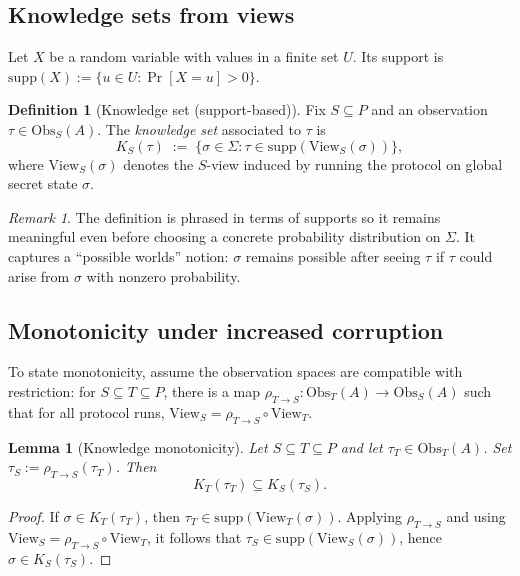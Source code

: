 \documentclass[11pt,a4paper]{article}
\newtheorem{lemma}[theorem]{Lemma}
\theoremstyle{definition}
\newtheorem{definition}[theorem]{Definition}
\theoremstyle{remark}
\newtheorem{remark}[theorem]{Remark}
\newcommand{\Parties}{P}
\newcommand{\View}{\mathrm{View}}
\newcommand{\Obs}{\mathrm{Obs}}
\newcommand{\supp}{\mathrm{supp}}
\begin{document}
\subsection{Knowledge sets from views}
Let \(X\) be a random variable with values in a finite set \(U\). Its support is \(\supp(X) := \{u\in U : \Pr[X=u] > 0\}\).

\begin{definition}[Knowledge set (support-based)]
\label{def:knowledge-set}
Fix \(S\subseteq \Parties\) and an observation \(\tau \in \Obs_S(A)\). The \emph{knowledge set} associated to \(\tau\) is
\begin{equation}
\label{eq:knowledge-set}
  K_S(\tau) \;:=\; \{\sigma \in \Sigma : \tau \in \supp(\View_S(\sigma))\},
\end{equation}
where \(\View_S(\sigma)\) denotes the \(S\)-view induced by running the protocol on global secret state \(\sigma\).
\end{definition}

\begin{remark}
The definition is phrased in terms of supports so it remains meaningful even before choosing a concrete probability distribution on \(\Sigma\). It captures a ``possible worlds'' notion: \(\sigma\) remains possible after seeing \(\tau\) if \(\tau\) could arise from \(\sigma\) with nonzero probability.
\end{remark}

\subsection{Monotonicity under increased corruption}
To state monotonicity, assume the observation spaces are compatible with restriction: for \(S\subseteq T\subseteq \Parties\), there is a map \(\rho_{T\to S} : \Obs_T(A)\to \Obs_S(A)\) such that for all protocol runs,
\(\View_S = \rho_{T\to S}\circ \View_T\).

\begin{lemma}[Knowledge monotonicity]
\label{lem:knowledge-monotonicity}
Let \(S\subseteq T\subseteq \Parties\) and let \(\tau_T\in \Obs_T(A)\). Set \(\tau_S := \rho_{T\to S}(\tau_T)\). Then
\[
K_T(\tau_T) \subseteq K_S(\tau_S).
\]
\end{lemma}

\begin{proof}
If \(\sigma \in K_T(\tau_T)\), then \(\tau_T \in \supp(\View_T(\sigma))\). Applying \(\rho_{T\to S}\) and using \(\View_S = \rho_{T\to S}\circ \View_T\), it follows that \(\tau_S \in \supp(\View_S(\sigma))\), hence \(\sigma \in K_S(\tau_S)\).
\end{proof}
\end{document}
